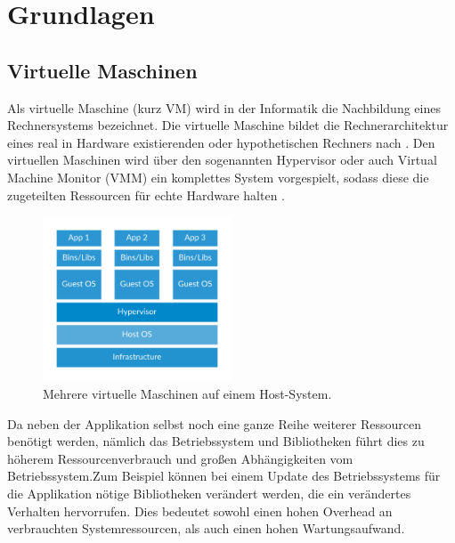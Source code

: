 \chapter{Grundlagen}


\section{Virtuelle Maschinen}
Als virtuelle Maschine (kurz VM) wird in der Informatik die Nachbildung eines Rechnersystems bezeichnet. Die virtuelle Maschine bildet die Rechnerarchitektur eines real in Hardware existierenden oder hypothetischen Rechners nach \cite{Sieg2007}. Den virtuellen Maschinen wird über den sogenannten Hypervisor oder auch Virtual Machine Monitor (VMM) ein komplettes System vorgespielt, sodass diese die zugeteilten Ressourcen für echte Hardware halten \cite{OSTEP}.\\

\begin{figure}[!ht] %
  \centering
  \includegraphics[width=0.5\textwidth]{images/1-docker-vm.png}
  \caption{Mehrere virtuelle Maschinen auf einem Host-System. \cite{docker}}
\end{figure}

\noindent Da neben der Applikation selbst noch eine ganze Reihe weiterer Ressourcen benötigt werden, nämlich das Betriebssystem und Bibliotheken führt dies zu höherem Ressourcenverbrauch und großen Abhängigkeiten vom Betriebssystem.\linebreak Zum Beispiel können bei einem Update des Betriebssystems für die Applikation nötige Bibliotheken verändert werden, die ein verändertes Verhalten hervorrufen. Dies bedeutet sowohl einen hohen Overhead an verbrauchten Systemressourcen, als auch einen hohen Wartungsaufwand.\\

